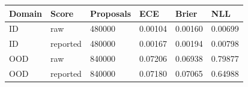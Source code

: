 \begin{tabular}{llllll}
\toprule
Domain & Score & Proposals & ECE & Brier & NLL \\
\midrule
ID & raw & 480000 & 0.00104 & 0.00160 & 0.00699 \\
ID & reported & 480000 & 0.00167 & 0.00194 & 0.00798 \\
OOD & raw & 840000 & 0.07206 & 0.06938 & 0.79877 \\
OOD & reported & 840000 & 0.07180 & 0.07065 & 0.64988 \\
\bottomrule
\end{tabular}
